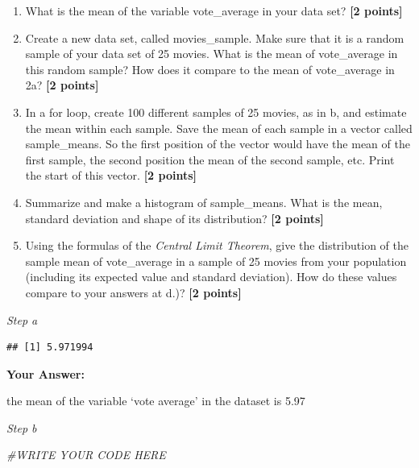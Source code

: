 \documentclass[
]{article}
\newenvironment{Shaded}{\begin{snugshade}}{\end{snugshade}}
\newcommand{\CommentTok}[1]{\textcolor[rgb]{0.56,0.35,0.01}{\textit{#1}}}
\newcommand{\FunctionTok}[1]{\textcolor[rgb]{0.13,0.29,0.53}{\textbf{#1}}}
\newcommand{\NormalTok}[1]{#1}
\newcommand{\SpecialCharTok}[1]{\textcolor[rgb]{0.81,0.36,0.00}{\textbf{#1}}}
\providecommand{\tightlist}{%
  \setlength{\itemsep}{0pt}\setlength{\parskip}{0pt}}
\begin{document}
\begin{enumerate}
\def\labelenumi{\alph{enumi}.}
\tightlist
\item
  What is the mean of the variable vote\_average in your data set?
  \textbf{[2 points]}
\item
  Create a new data set, called movies\_sample. Make sure that it is a
  random sample of your data set of 25 movies. What is the mean of
  vote\_average in this random sample? How does it compare to the mean
  of vote\_average in 2a? \textbf{[2 points]}
\item
  In a for loop, create 100 different samples of 25 movies, as in b, and
  estimate the mean within each sample. Save the mean of each sample in
  a vector called sample\_means. So the first position of the vector
  would have the mean of the first sample, the second position the mean
  of the second sample, etc. Print the start of this vector.
  \textbf{[2 points]}
\item
  Summarize and make a histogram of sample\_means. What is the mean,
  standard deviation and shape of its distribution? \textbf{[2 points]}
\item
  Using the formulas of the \emph{Central Limit Theorem}, give the
  distribution of the sample mean of vote\_average in a sample of 25
  movies from your population (including its expected value and standard
  deviation). How do these values compare to your answers at d.)?
  \textbf{[2 points]}
\end{enumerate}

\emph{Step a}

\begin{Shaded}
\end{Shaded}

\begin{verbatim}
## [1] 5.971994
\end{verbatim}

\textbf{Your Answer:}

the mean of the variable `vote average' in the dataset is 5.97

\emph{Step b}

\begin{Shaded}
\begin{Highlighting}[]
\CommentTok{\#WRITE YOUR CODE HERE}
\end{Highlighting}
\end{Shaded}
\end{document}
